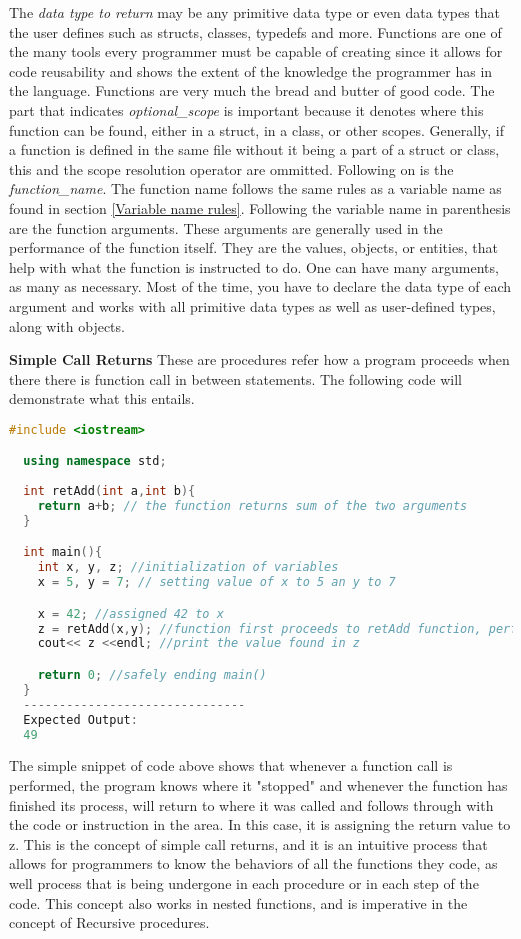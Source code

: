 \documentclass[12pt]{article}
\begin{document}
The \textit{data type to return} may be any primitive data type or even data types that the user defines such as structs, classes, typedefs and more. Functions are one of the many tools every programmer must be capable of creating since it allows for code reusability and shows the extent of the knowledge the programmer has in the language. Functions are very much the bread and butter of good code. The part that indicates \textit{optional\_scope} is important because it denotes where this function can be found, either in a struct, in a class, or other scopes. Generally, if a function is defined in the same file without it being a part of a struct or class, this and the scope resolution operator are ommitted. Following on is the \textit{function\_name}. The function name follows the same rules as a variable name as found in section \ref{Variable name rules}. Following the variable name in parenthesis are the function arguments. These arguments are generally used in the performance of the function itself. They are the values, objects, or entities, that help with what the function is instructed to do. One can have many arguments, as many as necessary. Most of the time, you have to declare the data type of each argument and works with all primitive data types as well as user-defined types, along with objects.

\textbf{Simple Call Returns} These are procedures refer how a program proceeds when there there is function call in between statements. The following code will demonstrate what this entails.
\begin{lstlisting}[language=C++]
  #include <iostream>

  using namespace std;
  
  int retAdd(int a,int b){
    return a+b; // the function returns sum of the two arguments
  }

  int main(){
    int x, y, z; //initialization of variables
    x = 5, y = 7; // setting value of x to 5 an y to 7

    x = 42; //assigned 42 to x
    z = retAdd(x,y); //function first proceeds to retAdd function, performs its process, and its return value is then assigned to z
    cout<< z <<endl; //print the value found in z

    return 0; //safely ending main()
  }
  -------------------------------
  Expected Output:
  49
\end{lstlisting}

The simple snippet of code above shows that whenever a function call is performed, the program knows where it "stopped" and whenever the function has finished its process, will return to where it was called and follows through with the code or instruction in the area. In this case, it is assigning the return value to z. This is the concept of simple call returns, and it is an intuitive process that allows for programmers to know the behaviors of all the functions they code, as well process that is being undergone in each procedure or in each step of the code. This concept also works in nested functions, and is imperative in the concept of Recursive procedures.
\end{document}
